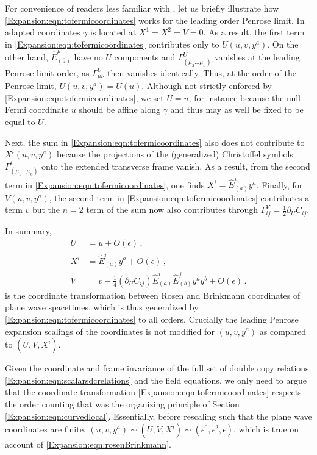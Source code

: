 For convenience of readers less familiar with \cite{Blau:2006ar}, let us briefly illustrate how \eqref{Expansion:eqn:tofermicoordinates} works for the leading order Penrose limit. In adapted coordinates $\gamma$ is located at $X^1 = X^2 = V = 0$. As a result, the first term in \eqref{Expansion:eqn:tofermicoordinates} contributes only to $U(u,v,y^a)$. On the other hand, $\hat{E}^{\mu}_{(\bar{a})}$ have no $U$ components and $\Gamma^{U}_{(\mu_2 \ldots \mu_{n})}$ vanishes at the leading Penrose limit order, as $\Gamma^{U}_{\mu \nu}$ then vanishes identically. Thus, at the order of the Penrose limit, $U(u,v,y^a) = U(u)$. Although not strictly enforced by \eqref{Expansion:eqn:tofermicoordinates}, we set $U = u$, for instance because the null Fermi coordinate $u$ should be affine along $\gamma$ and thus may as well be fixed to be equal to $U$. 

Next, the sum in \eqref{Expansion:eqn:tofermicoordinates} also does not contribute to $X^i(u,v,y^a)$ because the projections of the (generalized) Christoffel symbols $\Gamma^{i}_{(\mu_1 \ldots \mu_n)}$ onto the extended transverse frame vanish. As a result, from the second term in \eqref{Expansion:eqn:tofermicoordinates}, one finds $X^i = \hat{E}^i_{(a)} y^a$. Finally, for $V(u,v,y^a)$, the second term in \eqref{Expansion:eqn:tofermicoordinates} contributes a term $v$ but the $n=2$ term of the sum now also contributes through $\Gamma^{V}_{i j} = \frac{1}{2} \partial_U C_{ij}$. 

In summary, 
\begin{equation}\label{Expansion:eqn:rosenBrinkmann}
\begin{aligned}
U &= u + O(\epsilon)\, , \\
X^i &= \hat{E}^i_{(a)} y^a + O(\epsilon) \, , \\
V &= v - \frac{1}{4}\left(\partial_U C_{ij}\right) \hat{E}^i_{(a)}\hat{E}^j_{(b)} y^a y^b + O(\epsilon) \, . 
\end{aligned}
\end{equation}
is the coordinate transformation between Rosen and Brinkmann coordinates of plane wave spacetimes, which is thus generalized by \eqref{Expansion:eqn:tofermicoordinates} to all orders. Crucially the leading Penrose expansion scalings of the coordinates is not modified for $(u,v,y^a)$ as compared to $(U,V,X^i)$.

Given the coordinate and frame invariance of the full set of double copy relations \eqref{Expansion:eqn:scalarsdcrelations} and the field equations, we only need to argue that the coordinate transformation \eqref{Expansion:eqn:tofermicoordinates} respects the order counting that was the organizing principle of Section \ref{Expansion:eqn:curvedlocal}. Essentially, before rescaling such that the plane wave coordinates are finite, $(u,v,y^a) \sim (U,V,X^i) \sim (\epsilon^0, \epsilon^2, \epsilon)$, which is true on account of \eqref{Expansion:eqn:rosenBrinkmann}. 

